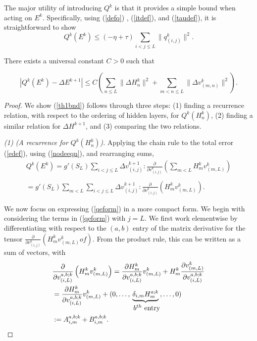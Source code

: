 \documentclass{jcmlatex}
\begin{document}
The major utility of introducing $Q^k$ is that it provides a simple bound
when acting on $E^k$.  Specifically, using (\ref{defq}) , (\ref{itdef}),
and (\ref{taudef}), it is straightforward to show
\begin{equation}
Q^k(E^k)\le (-\eta+\tau)\sum_{i<j \le L}\|q_{(i,j)} ^k\|^2. \label{midest}
\end{equation}\begin{theorem}\label{bigtheo}

There exists a universal constant $C>0$ such that

\begin{equation}
|Q^k(E^k)-\Delta E^{k+1}| \le C\left(\sum_{n\le L}\|\Delta H_n^k\|^2 + \sum_{m<n\le
L}\|\Delta v_{(m,n)}^k\|^2\right). \label{th1bnd}
\end{equation}
\end{theorem}\begin{proof} We show (\ref{th1bnd}) follows through three steps: (1) finding a recurrence relation, with respect to the ordering of hidden layers, for $Q^k(H^k_n)$, (2) finding a similar relation for $\Delta H^{k+1}$, and (3) comparing the two relations.
 
 \textit{(1) (A recurrence for $Q^k(H_n^k)$).} Applying the  chain rule to the total error (\ref{edef}), using (\ref{nodeeqn}),
 and rearranging sums, \begin{align}\label{crule1}
Q^k(E^{k}) = g'(S_L)\sum_{i<j\le L} \Delta v_{(i,j)}^{k+1}:
\frac{\partial }{\partial v_{(i,j)}^k}\left(\sum_{m<L}H_m^{k}v_{(m,L)}^k
 \right)\\\\  =   g'(S_L)\sum_{m<L}\sum_{i<j\le L} \Delta v_{(i,j)}^{k+1}:
\frac{\partial }{\partial v_{(i,j)}^k}\left(H_m^{k}v_{(m,L)}^k \right) \label{qeform}.
\end{align}

We now focus on expressing (\ref{qeform}) in a more compact form. We begin with considering the terms in (\ref{qeform}) with $j = L$. We first work elementwise by differentiating with respect to  the $(a,b)$ entry of the matrix derivative for the tensor $\frac{\partial }{\partial v_{(i,j)}^k}\left(H_m^{k}v_{(m,L)}^k of \right)$. From the product rule,  this can be written as a sum of vectors, with
\begin{align} \label{msplit}
&\frac{\partial }{\partial v_{(i,L)}^{a,b;k}}\left( H_m^{k}v_{(m,L)}^k \right)
= \frac{\partial  H_m^{k} }{\partial v_{(i,L)}^{a,b;k}}v_{(m,L)}^k + H_m^{k}
\frac{\partial v_{(m,L)}^k }{\partial v_{(i,L)}^{a,b;k}}\\
  &=  \frac{\partial  H_m^{k} }{\partial v_{(i,L)}^{a,b;k}}v_{(m,L)}^k +
(0, \dots,\underbrace{ \delta_{i,m}H_m^{a;k}}_{\hbox{ $b^{th}$ entry}}, \dots,
0)\\
&:=A_{i,m}^{a,b;k}+B_{i,m}^{a,b;k}.  \label{msplit2}
\end{align} 
 

\end{proof}
\end{document}
